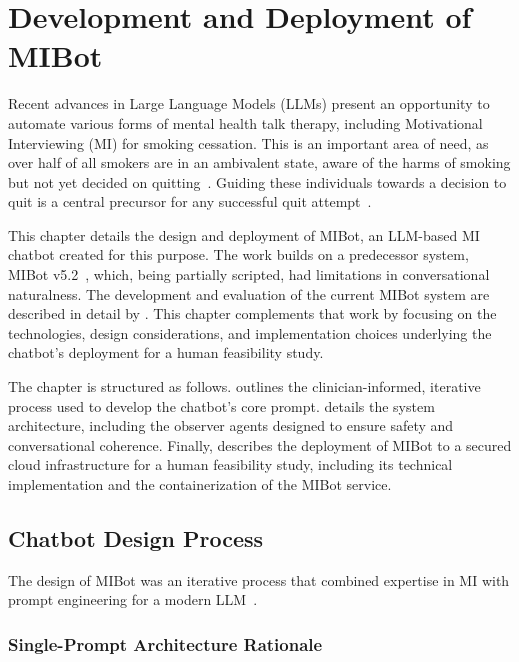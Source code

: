 \chapter{Development and Deployment of MIBot}
\label{ch:mibot}

Recent advances in Large Language Models (LLMs) present an opportunity to automate various forms of mental health talk therapy, including Motivational Interviewing (MI) for smoking cessation. This is an important area of need, as over half of all smokers are in an ambivalent state, aware of the harms of smoking but not yet decided on quitting~\citep{Babb2017}. Guiding these individuals towards a decision to quit is a central precursor for any successful quit attempt~\citep{West2006}.

This chapter details the design and deployment of MIBot, an LLM-based MI chatbot created for this purpose. The work builds on a predecessor system, MIBot v5.2~\citep{brown2023mi}, which, being partially scripted, had limitations in conversational naturalness. The development and evaluation of the current MIBot system are described in detail by \citet{mahmood-etal-2025-fully}. This chapter complements that work by focusing on the technologies, design considerations, and implementation choices underlying the chatbot's deployment for a human feasibility study.

The chapter is structured as follows.  outlines the clinician-informed, iterative process used to develop the chatbot's core prompt.  details the system architecture, including the observer agents designed to ensure safety and conversational coherence. Finally,  describes the deployment of MIBot to a secured cloud infrastructure for a human feasibility study, including its technical implementation and the containerization of the MIBot service.




\section{Chatbot Design Process}
\label{sec:iterative-development}

The design of MIBot was an iterative process that combined expertise in MI with prompt engineering for a modern LLM~\citep{openai2024gpt4ocard}.

\subsection{Single-Prompt Architecture Rationale}
\label{sec:single-prompt-rationale}

